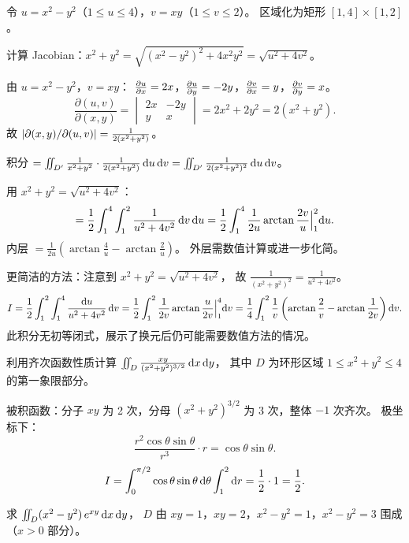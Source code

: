 \documentclass{ctexart}
\begin{document}
\begin{solution}
  令 $u = x^2 - y^2$（$1 \le u \le 4$），$v = xy$（$1 \le v \le 2$）。
  区域化为矩形 $[1,4]\times[1,2]$。

  计算 Jacobian：$x^2+y^2 = \sqrt{(x^2-y^2)^2 + 4x^2y^2} = \sqrt{u^2+4v^2}$。

  由 $u = x^2-y^2$，$v = xy$：
  $\frac{\partial u}{\partial x} = 2x$，$\frac{\partial u}{\partial y} = -2y$，$\frac{\partial v}{\partial x} = y$，$\frac{\partial v}{\partial y} = x$。
  \[
    \frac{\partial(u,v)}{\partial(x,y)} = \begin{vmatrix} 2x & -2y \\ y & x \end{vmatrix}
    = 2x^2 + 2y^2 = 2(x^2+y^2).
  \]
  故 $\left| \partial(x,y)/\partial(u,v) \right| = \frac{1}{2(x^2+y^2)}$。

  积分 $= \iint_{D'} \frac{1}{x^2+y^2}\cdot\frac{1}{2(x^2+y^2)}\,\mathrm{d} u\,\mathrm{d} v
  = \iint_{D'} \frac{1}{2(x^2+y^2)^2}\,\mathrm{d} u\,\mathrm{d} v$。

  用 $x^2+y^2 = \sqrt{u^2+4v^2}$：
  \[
    = \frac{1}{2}\int_1^4\int_1^2 \frac{1}{u^2+4v^2}\,\mathrm{d} v\,\mathrm{d} u
    = \frac{1}{2}\int_1^4 \frac{1}{2u}\arctan\frac{2v}{u}\Big|_1^2 \mathrm{d} u.
  \]
  内层 $= \frac{1}{2u}\left(\arctan\frac{4}{u} - \arctan\frac{2}{u}\right)$。
  外层需数值计算或进一步化简。

  更简洁的方法：注意到 $x^2+y^2 = \sqrt{u^2+4v^2}$，
  故 $\frac{1}{(x^2+y^2)^2} = \frac{1}{u^2+4v^2}$。
  \[
    I = \frac{1}{2}\int_1^2\int_1^4 \frac{\mathrm{d} u}{u^2+4v^2}\,\mathrm{d} v
    = \frac{1}{2}\int_1^2 \frac{1}{2v}\arctan\frac{u}{2v}\Big|_1^4 \mathrm{d} v
    = \frac{1}{4}\int_1^2 \frac{1}{v}\left(\arctan\frac{2}{v} - \arctan\frac{1}{2v}\right)\mathrm{d} v.
  \]
  此积分无初等闭式，展示了换元后仍可能需要数值方法的情况。
\end{solution}

\begin{exercise}
  利用齐次函数性质计算 $\iint_D \frac{xy}{(x^2+y^2)^{3/2}}\,\mathrm{d} x\,\mathrm{d} y$，
  其中 $D$ 为环形区域 $1 \le x^2+y^2 \le 4$ 的第一象限部分。
\end{exercise}

\begin{solution}
  被积函数：分子 $xy$ 为 2 次，分母 $(x^2+y^2)^{3/2}$ 为 3 次，整体 $-1$ 次齐次。
  极坐标下：
  \[
    \frac{r^2\cos\theta\sin\theta}{r^3}\cdot r = \cos\theta\sin\theta.
  \]
  \[
    I = \int_0^{\pi/2}\cos\theta\sin\theta\,\mathrm{d}\theta\int_1^2 \mathrm{d} r
    = \frac{1}{2}\cdot 1 = \frac{1}{2}.
  \]
\end{solution}

\begin{exercise}
  求 $\iint_D (x^2-y^2)\,e^{xy}\,\mathrm{d} x\,\mathrm{d} y$，
  $D$ 由 $xy = 1$，$xy = 2$，$x^2-y^2 = 1$，$x^2-y^2 = 3$ 围成（$x > 0$ 部分）。
\end{exercise}
\end{document}

